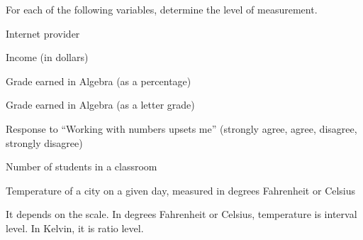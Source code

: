 \documentclass{ximera}
\begin{document}
\begin{problem}
For each of the following variables, determine the level of measurement.

\begin{question}
Internet provider
\begin{multipleChoice}
\end{multipleChoice}
\end{question}

\begin{question}
Income (in dollars)
\begin{multipleChoice}
\end{multipleChoice}
\end{question}

\begin{question}
Grade earned in Algebra (as a percentage)
\begin{multipleChoice}
\end{multipleChoice}
\end{question}

\begin{question}
Grade earned in Algebra (as a letter grade)
\begin{multipleChoice}
\end{multipleChoice}
\end{question}

\begin{question}
Response to ``Working with numbers upsets me'' (strongly agree, agree, disagree, strongly disagree)
\begin{multipleChoice}
\end{multipleChoice}
\end{question}

\begin{question}
Number of students in a classroom
\begin{multipleChoice}
\end{multipleChoice}
\end{question}

\begin{question}
Temperature of a city on a given day, measured in degrees Fahrenheit or Celsius
\begin{multipleChoice}
\end{multipleChoice}
\begin{explanation}
It depends on the scale. In degrees Fahrenheit or Celsius, temperature is interval level. In Kelvin, it is ratio level.
\end{explanation}
\end{question}


\end{problem}
\end{document}
